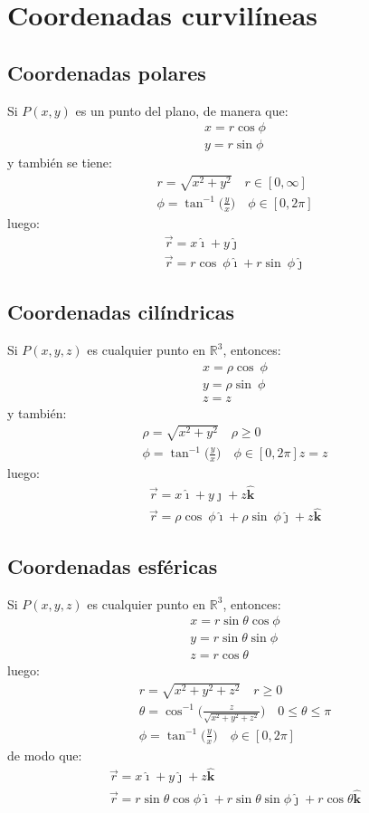 \documentclass[a4paper]{article}
\newcommand{\ihat}{\boldsymbol{\hat{\imath}}}
\newcommand{\jhat}{\boldsymbol{\hat{\jmath}}}
\newcommand{\khat}{\boldsymbol{\hat{\bm{k}}}}
\begin{document}
\section{Coordenadas curvilíneas}
\subsection{Coordenadas polares}
Si $P(x,y)$ es un punto del plano, de manera que:
\begin{gather*}
x=r\cos \phi\\
y=r\sin \phi
\end{gather*}
y también se tiene:
\begin{gather*}
r=\sqrt{x^2+y^2}\quad r\in[0,\infty]\\
\phi=\tan^{-1}\Big(\frac{y}{x}\Big)\quad\phi\in[0,2\pi] 
\end{gather*}
luego:
\begin{gather}
\tag{Sistema cartesiano}
\vec{r}=x\ihat+y\jhat\\
\tag{Sistema polar}
\vec{r}=r\cos\ \phi\ihat+r\sin\ \phi\jhat
\end{gather}
\subsection{Coordenadas cilíndricas}
Si $P(x,y,z)$ es cualquier punto en $\mathbb{R}^3$, entonces:
\begin{gather*}
x=\rho\cos\ \phi\\
y=\rho\sin\ \phi\\
z=z
\end{gather*}
y también:
\begin{gather*}
\rho=\sqrt{x^2+y^2}\quad\rho\geq 0\\
\phi=\tan^{-1}\Big(\frac{y}{x}\Big)\quad\phi\in[0,2\pi] 
z=z
\end{gather*}
luego:
\begin{gather}
\tag{Sistema cartesiano}
\vec{r}=x\ihat+y\jhat+z\khat\\
\tag{Sistema cilindrico}
\vec{r}=\rho\cos\ \phi\ihat+\rho\sin\ \phi\jhat+z\khat
\end{gather}
\subsection{Coordenadas esféricas}
Si $P(x,y,z)$ es cualquier punto en $\mathbb{R}^3$, entonces:
\begin{gather*}
x=r\sin\theta\cos\phi\\
y=r\sin\theta\sin\phi\\
z=r\cos\theta 
\end{gather*}
luego:
\begin{gather*}
r=\sqrt{x^2+y^2+z^2}\quad r\geq 0\\
\theta=\cos^{-1}\Bigg(\frac{z}{\sqrt{x^2+y^2+z^2}}\Bigg)\quad 0\leq\theta\leq\pi\\
\phi=\tan^{-1}\Big(\frac{y}{x}\Big)\quad\phi\in[0,2\pi] 
\end{gather*}
de modo que:
\begin{gather}
\tag{Sistema cartesiano}
\vec{r}=x\ihat+y\jhat+z\khat\\
\tag{Sistema esférico}
\vec{r}=r\sin\theta\cos\phi\ihat+r\sin\theta\sin\phi\jhat+r\cos\theta\khat 
\end{gather}
\end{document}
